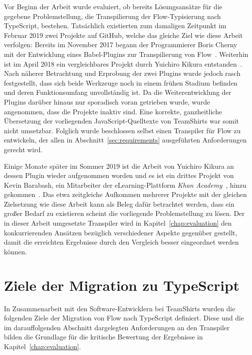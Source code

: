 Vor Beginn der Arbeit wurde evaluiert, ob bereits Lösungsansätze für die gegebene Problemstellung, die Transpilierung der Flow-Typisierung nach TypeScript, bestehen. Tatsächlich existierten zum damaligen Zeitpunkt im Februar 2019 zwei Projekte auf GitHub, welche das gleiche Ziel wie diese Arbeit verfolgen: Bereits im November 2017 begann der Programmierer Boris Cherny mit der Entwicklung eines Babel-Plugins zur Transpilierung von Flow~\autocite{CHERNY:FLOW_TO_TS}. Weiterhin ist im April 2018 ein vergleichbares Projekt durch Yuichiro Kikura entstanden~\autocite{KIKURA:FLOW_TO_TS}. Nach näherer Betrachtung und Erprobung der zwei Plugins wurde jedoch rasch festgestellt, dass sich beide Werkzeuge noch in einem frühen Stadium befinden und deren Funktionsumfang unvollständig ist. Da die Weiterentwicklung der Plugins darüber hinaus nur sporadisch voran getrieben wurde, wurde angenommen, dass die Projekte inaktiv sind. Eine korrekte, ganzheitliche Übersetzung der vorliegenden JavaScript-Quelltexte von TeamShirts war somit nicht umsetzbar. Folglich wurde beschlossen selbst einen Transpiler für Flow zu entwickeln, der allen in Abschnitt~\ref{sec:requirements} ausgeführten Anforderungen gerecht wird.

Einige Monate später im Sommer 2019 ist die Arbeit von Yuichiro Kikura an dessen Plugin wieder aufgenommen worden und es ist ein drittes Projekt von Kevin Barabash, ein Mitarbeiter der eLearning-Plattform \textit{Khan Academy}~\autocite{KHAN_ACADEMY}, hinzu gekommen~\autocite{BARABASH:FLOW_TO_TS}. Das etwa zeitgleiche Aufkommen mehrerer Projekte mit der gleichen Zielsetzung wie diese Arbeit kann als Beleg dafür betrachtet werden, dass ein großer Bedarf zu existieren scheint die vorliegende Problemstellung zu lösen.
Der in dieser Arbeit umgesetzte Transpiler wird in Kapitel~\ref{chap:evaluation} den konkurrierenden Ansätzen bezüglich verschiedener Aspekte gegenüber gestellt, damit die erreichten Ergebnisse durch den Vergleich besser eingeordnet werden können.

\section{Ziele der Migration zu TypeScript}
\label{sec:goals}

In Zusammenarbeit mit den Software-Entwicklern bei TeamShirts wurden die folgenden Ziele der Migration von Flow nach TypeScript definiert. Diese und die im darauffolgenden Abschnitt dargelegten Anforderungen an den Transpiler bilden die Grundlage für die kritische Bewertung der Ergebnisse in Kapitel~\ref{chap:evaluation}.

